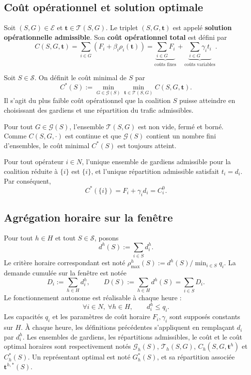 \subsection{Coût opérationnel et solution optimale}


\begin{definition}
Soit $(S, G)\in\mathcal E$ et $\mathbf{t}\in\mathcal{T}(S, G)$.
Le triplet $(S,G,\mathbf t)$ est appelé \textbf{solution opérationnelle admissible}.
Son \textbf{coût opérationnel total} est défini par
\[
C(S,G , \mathbf{t})
=\sum_{i\in G}\left(F_i+\beta_i\rho_i(\mathbf t)\right)
=\underbrace{\sum_{i\in G}F_i}_{\text{coûts fixes}}
+\underbrace{\sum_{i\in G}\gamma_i t_i}_{\text{coûts variables}}.
\]
\end{definition}

\begin{definition}
Soit $S\in \mathcal S$. On définit le coût minimal de $S$ par
\[
C^{*}(S):=\min_{G \in\mathcal{G}(S)}\min_{\mathbf{t}\in\mathcal T(S, G)}C(S, G, \mathbf{t}).
\]
Il s'agit du plus faible coût opérationnel que la coalition \(S\) puisse
atteindre en choisissant des gardiens et une répartition du trafic admissibles.
\end{definition}

Pour tout \(G\in\mathcal G(S)\), l'ensemble \(\mathcal T(S,G)\) est non vide,
fermé et borné. Comme \(C(S,G,\cdot)\) est continue et que
\(\mathcal G(S)\) contient un nombre fini d'ensembles, le coût minimal
\(C^*(S)\) est toujours atteint.


\begin{remarque}
\label{rem:eq}
Pour tout opérateur \(i\in N\), l'unique ensemble de gardiens admissible pour
la coalition réduite à \(\{i\}\) est \(\{i\}\),
et l'unique répartition admissible satisfait $t_i=d_i$. Par conséquent,
\[
C^*(\{i\})=F_i+\gamma_i d_i=C_i^0.
\]
\end{remarque}

\subsection{Agrégation horaire sur la fenêtre}
\label{subsec:fenetre_decision}

Pour tout \(h\in H\) et tout \(S\in\mathcal S\), posons
\[
    d^h(S):=\sum_{i\in S}d_i^h.
\]
Le critère horaire correspondant est noté
\(\rho_{\max}^h(S):=d^h(S)/\min_{i\in S}q_i\).
La demande cumulée sur la fenêtre est notée
\[
    D_i:=\sum_{h\in H}d_i^h,
    \qquad
    D(S):=\sum_{h\in H}d^h(S)=\sum_{i\in S}D_i.
\]
Le fonctionnement autonome est réalisable à chaque heure :
\[
    \forall i\in N,\ \forall h\in H,\qquad
    d_i^h\leqslant q_i.
\]
Les capacités \(q_i\) et les paramètres de coût horaire
\(F_i,\gamma_i\) sont supposés constants sur \(H\). À chaque heure, les
définitions précédentes s'appliquent en remplaçant \(d_i\) par \(d_i^h\).
Les ensembles de gardiens, les répartitions admissibles, le coût et le coût
optimal horaires sont respectivement notés
\(\mathcal G_h(S)\), \(\mathcal T_h(S,G)\),
\(C_h(S,G,\mathbf t^h)\) et \(C_h^*(S)\). Un représentant optimal est noté
\(G_h^*(S)\), et sa répartition associée \(\mathbf t^{h,*}(S)\).

